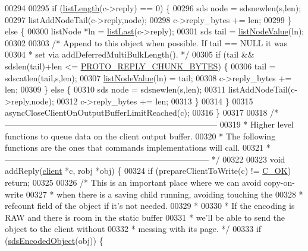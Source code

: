 \begin{DoxyCode}
00294 
00295     \textcolor{keywordflow}{if} (\hyperlink{adlist_8h_afde0ab079f934670e82119b43120e94b}{listLength}(c->reply) == 0) \{
00296         sds node = sdsnewlen(s,len);
00297         listAddNodeTail(c->reply,node);
00298         c->reply\_bytes += len;
00299     \} \textcolor{keywordflow}{else} \{
00300         listNode *ln = \hyperlink{adlist_8h_a5e0fad60032ef0fe9adcf9811e2f2fba}{listLast}(c->reply);
00301         sds tail = \hyperlink{adlist_8h_af84cae230e7180ebcda1e2736fce9f65}{listNodeValue}(ln);
00302 
00303         \textcolor{comment}{/* Append to this object when possible. If tail == NULL it was}
00304 \textcolor{comment}{         * set via addDeferredMultiBulkLength(). */}
00305         \textcolor{keywordflow}{if} (tail && sdslen(tail)+len <= \hyperlink{server_8h_ab467e0a40be9097e85445616d9bb32e3}{PROTO\_REPLY\_CHUNK\_BYTES}) \{
00306             tail = sdscatlen(tail,s,len);
00307             \hyperlink{adlist_8h_af84cae230e7180ebcda1e2736fce9f65}{listNodeValue}(ln) = tail;
00308             c->reply\_bytes += len;
00309         \} \textcolor{keywordflow}{else} \{
00310             sds node = sdsnewlen(s,len);
00311             listAddNodeTail(c->reply,node);
00312             c->reply\_bytes += len;
00313         \}
00314     \}
00315     asyncCloseClientOnOutputBufferLimitReached(c);
00316 \}
00317 
00318 \textcolor{comment}{/* -----------------------------------------------------------------------------}
00319 \textcolor{comment}{ * Higher level functions to queue data on the client output buffer.}
00320 \textcolor{comment}{ * The following functions are the ones that commands implementations will call.}
00321 \textcolor{comment}{ * -------------------------------------------------------------------------- */}
00322 
00323 \textcolor{keywordtype}{void} addReply(\hyperlink{structclient}{client} *c, robj *obj) \{
00324     \textcolor{keywordflow}{if} (prepareClientToWrite(c) != \hyperlink{server_8h_a303769ef1065076e68731584e758d3e1}{C\_OK}) \textcolor{keywordflow}{return};
00325 
00326     \textcolor{comment}{/* This is an important place where we can avoid copy-on-write}
00327 \textcolor{comment}{     * when there is a saving child running, avoiding touching the}
00328 \textcolor{comment}{     * refcount field of the object if it's not needed.}
00329 \textcolor{comment}{     *}
00330 \textcolor{comment}{     * If the encoding is RAW and there is room in the static buffer}
00331 \textcolor{comment}{     * we'll be able to send the object to the client without}
00332 \textcolor{comment}{     * messing with its page. */}
00333     \textcolor{keywordflow}{if} (\hyperlink{server_8h_afcfb5bd97af52d1dbce331745cae030c}{sdsEncodedObject}(obj)) \{

\end{DoxyCode}
